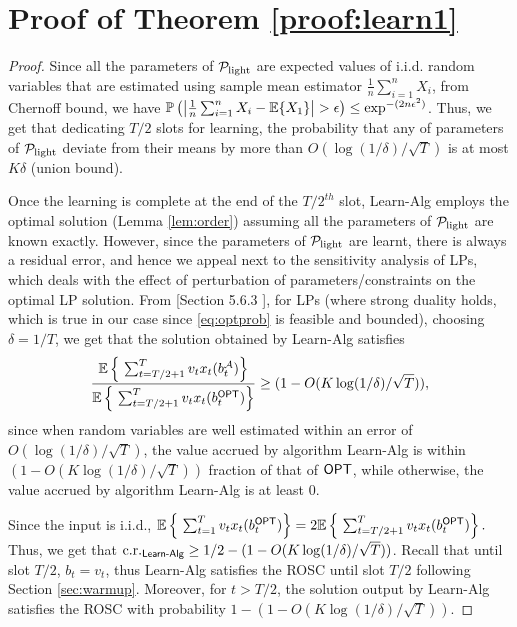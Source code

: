\section{Proof of Theorem \ref{proof:learn1}}
\begin{proof}
Since all the parameters of $\mathcal{P}_{\text{light}}$ are expected values of i.i.d. random variables that are estimated using sample mean estimator $\frac{1}{n}\sum_{i=1}^n X_i$, from Chernoff bound, we have 
$ {\mathbb{P}}\left( \left | \frac{1}{n}\sum_{i=1}^n X_i - {\mathbb{E}}\{X_1\} \right | > \epsilon\right) \le \exp^{ -(2n \epsilon^2)}$.
Thus, we get that dedicating $T/2$ slots for learning, the probability that any of parameters of $\mathcal{P}_{\text{light}}$ deviate from their means by more than $O(\log(1/\delta)/\sqrt{T})$ is at most $K \delta$ (union bound).

Once the learning is complete at the end of the $T/2^{th}$ slot, \textsf{Learn-Alg} employs the optimal solution (Lemma \ref{lem:order}) assuming all the parameters 
of $\mathcal{P}_{\text{light}}$ are known exactly. However, since the parameters of $\mathcal{P}_{\text{light}}$ are learnt, there is always a residual error, and hence we appeal next to the sensitivity analysis \cite{boyd2004convex} of LPs, which deals with the effect of perturbation of parameters/constraints on the optimal LP solution.
From [Section 5.6.3 \cite{boyd2004convex}], for LPs (where strong duality holds, which is true in our case since \eqref{eq:optprob} is feasible and bounded), choosing $\delta = 1/T$, we get that  the solution obtained by \textsf{Learn-Alg} satisfies
  $$\frac{ {\mathbb{E}}\left\{\ \sum_{t=T/2+1}^T v_t x_t(b^{\mathcal{A}}_t)\right\} }{ {\mathbb{E}}\left\{\ \sum_{t=T/2+1}^T v_t x_t(b^{\mathsf{OPT}}_t)\right\} }\ge (1-O(K\log(1/\delta)/\sqrt{T})) ,$$ 
  since when random variables are well estimated within an error of $O(\log(1/\delta)/\sqrt{T})$, the value accrued by algorithm \textsf{Learn-Alg} is within $(1-O(K\log(1/\delta)/\sqrt{T}))$ fraction of that of $\mathsf{OPT}$, while otherwise, 
 the value accrued by algorithm \textsf{Learn-Alg} is at least $0$.
  
  Since the input is i.i.d., $\bbE\left\{\ \sum_{t=1}^T v_t x_t(b^\opt_t)\right\} = 2 \bbE\left\{\ \sum_{t=T/2+1}^T v_t x_t(b^\opt_t)\right\}.$
  Thus, we get that $\text{c.r.}_{\text{\textsf{Learn-Alg}}} \ge 1/2 -(1-O(K\log(1/\delta)/\sqrt{T}))$.
  Recall that until slot $T/2$, $b_t=v_t$, thus \textsf{Learn-Alg} satisfies the ROSC until slot $T/2$ following Section \ref{sec:warmup}.
  Moreover, for $t>T/2$, the solution output by \textsf{Learn-Alg}  satisfies the ROSC with probability $1-(1-O(K\log(1/\delta)/\sqrt{T}))$. 
\end{proof}